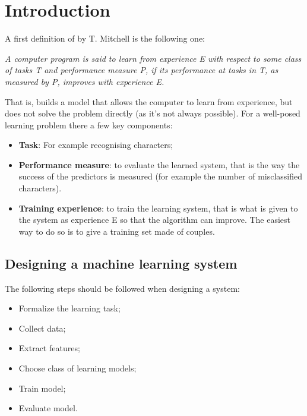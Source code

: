 \chapter{Introduction}
A first definition of \ml by T. Mitchell is the following one:
\begin{center}
	\textit{A computer program is said to learn from experience E with respect to some class of tasks T and performance measure P, if its performance at tasks in T, as measured by P, improves with experience E.}
\end{center}
That is, \ml builds a model that allows the computer to learn from experience, but does not solve the problem directly (as it's not always possible). \newline
For a well-posed learning problem there a few key components:
\begin{itemize}
	\item \textbf{Task}: For example recognising characters;
	\item \textbf{Performance measure}: to evaluate the learned system, that is the way the success of the predictors is measured (for example the number of misclassified characters).
	\item \textbf{Training experience}: to train the learning system, that is what is given to the system as experience E so that the algorithm can improve. The easiest way to do so is to give a training set made of couples.
\end{itemize}
\section{Designing a machine learning system}
The following steps should be followed when designing a \ml system:
\begin{itemize}
	\item Formalize the learning task;
	\item Collect data;
	\item Extract features;
	\item Choose class of learning models;
	\item Train model;
	\item Evaluate model.
\end{itemize}
